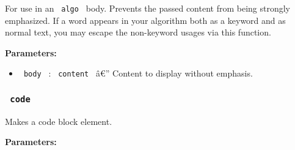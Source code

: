 For use in an \texttt{\ algo\ } body. Prevents the passed content from
being strongly emphasized. If a word appears in your algorithm both as a
keyword and as normal text, you may escape the non-keyword usages via
this function.

\begin{Shaded}
\begin{Highlighting}[]
\NormalTok{)}
\end{Highlighting}
\end{Shaded}

\textbf{Parameters:}

\begin{itemize}
\tightlist
\item
  \texttt{\ body\ } : \texttt{\ content\ } â€'' Content to display
  without emphasis.
\end{itemize}

\subsubsection{\texorpdfstring{\texttt{\ code\ }}{ code }}\label{code}

Makes a code block element.

\begin{Shaded}
\begin{Highlighting}[]
\NormalTok{)}
\end{Highlighting}
\end{Shaded}

\textbf{Parameters:}

